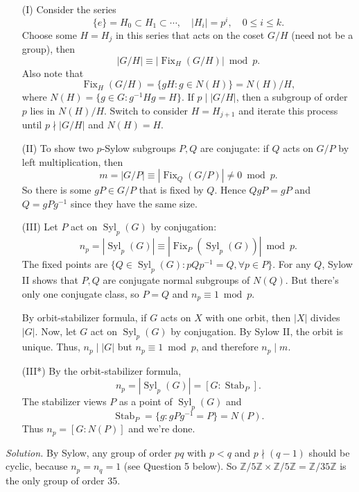 \documentclass{mathproblems}
\newcommand\Z{\mathbb{Z}}
\begin{document}
\begin{questions}
{\color{teal}
\begin{itemize}
\item[(I)] Consider the series
$$
\{e\}=H_0\subset H_1\subset \cdots, \quad |H_i|=p^i,\quad 0\leqslant i\leqslant k.
$$
Choose some $H=H_j$ in this series that acts on the coset $G/H$ (need not be a group), then
$$
|G/H|\equiv |\operatorname{Fix}_H(G/H)|\bmod p.
$$
Also note that 
$$
\operatorname{Fix}_H(G/H)=\{gH:g\in N(H)\}=N(H)/H,
$$
where $N(H)=\{g\in G: g^{-1}Hg=H\}$. If $p\mid |G/H|$, then a subgroup of order $p$ lies in $N(H)/H$. Switch to consider $H=H_{j+1}$ and iterate this process until $p\nmid |G/H|$ and $N(H)=H$.

\item[(II)] To show two $p$-Sylow subgroups $P,Q$ are conjugate: if $Q$ acts on $G/P$ by left multiplication, then $$
m=|G/P|\equiv |\operatorname{Fix}_Q(G/P)| \neq 0 \bmod p.
$$
So there is some $gP\in G/P$ that is fixed by $Q$. Hence $QgP=gP$ and $Q=gPg^{-1}$ since they have the same size.

\item[(III)] Let $P$ act on $\operatorname{Syl}_p(G)$ by conjugation:
$$
n_p=|\operatorname{Syl}_p(G)|\equiv |\operatorname{Fix}_{P}(\operatorname{Syl}_p(G))| \bmod p.
$$
The fixed points are $\{Q\in \operatorname{Syl}_p(G): pQp^{-1}=Q,\forall p\in P\}$. For any $Q$, Sylow II shows that $P,Q$ are conjugate normal subgroups of $N(Q)$. But there's only one conjugate class, so $P=Q$ and $n_p\equiv 1\bmod p$. 

By orbit-stabilizer formula, if $G$ acts on $X$ with one orbit, then $|X|$ divides $|G|$. Now, let $G$ act on $\operatorname{Syl}_p(G)$ by conjugation. By Sylow II, the orbit is unique. Thus, $n_p\mid |G|$ but $n_p\equiv 1\bmod p$, and therefore $n_p\mid m$.

\item[(III*)] By the orbit-stabilizer formula,
$$
n_p=|\operatorname{Syl}_p(G)|=[G:\operatorname{Stab}_{P}].
$$
The stabilizer views $P$ as a point of $\operatorname{Syl}_p(G)$ and 
$$
\operatorname{Stab}_{P}=\{g:gPg^{-1}=P\}=N(P).
$$
Thus $n_p=[G:N(P)]$ and we're done.
\end{itemize}
}


\textit{Solution.}
By Sylow, any group of order $p q$ with $p<q$ and $p\nmid (q-1)$ should be cyclic, because $n_p=n_q=1$ (see Question 5 below). So $\Z/5\Z \times \Z/5\Z = \Z/35\Z$ is the only group of order 35.


\end{questions}
\end{document}
